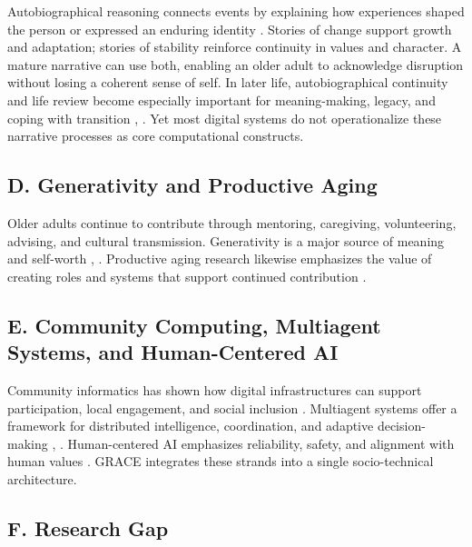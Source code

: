 \documentclass[
  journal,
]{IEEEtran}%
\begin{document}
Autobiographical reasoning connects events by explaining how experiences
shaped the person or expressed an enduring identity
. Stories of change support
growth and adaptation; stories of stability reinforce continuity in
values and character. A mature narrative can use both, enabling an older
adult to acknowledge disruption without losing a coherent sense of self.
In later life, autobiographical continuity and life review become
especially important for meaning-making, legacy, and coping with
transition ,
. Yet most digital
systems do not operationalize these narrative processes as core
computational constructs.

\subsection{D. Generativity and Productive
Aging}\label{d.-generativity-and-productive-aging}

Older adults continue to contribute through mentoring, caregiving,
volunteering, advising, and cultural transmission. Generativity is a
major source of meaning and self-worth
,
. Productive aging research
likewise emphasizes the value of creating roles and systems that support
continued contribution
.

\subsection{E. Community Computing, Multiagent Systems, and
Human-Centered
AI}\label{e.-community-computing-multiagent-systems-and-human-centered-ai}

Community informatics has shown how digital infrastructures can support
participation, local engagement, and social inclusion
. Multiagent systems offer
a framework for distributed intelligence, coordination, and adaptive
decision-making ,
. Human-centered AI
emphasizes reliability, safety, and alignment with human values
. GRACE integrates these
strands into a single socio-technical architecture.

\subsection{F. Research Gap}\label{f.-research-gap}
\end{document}
